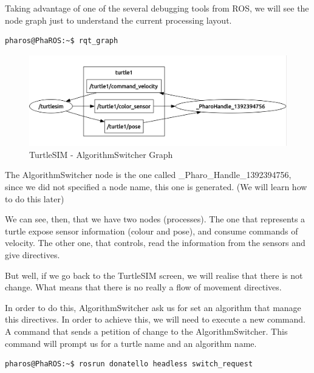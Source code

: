 \documentclass[a4paper,10pt,twoside]{book}
\begin{document}
		
		
			
			Taking advantage of one of the several debugging tools from ROS, we will see the node graph just to understand the current processing layout.
			
			
			\begin{lstlisting}[language=bash,title={Analysing graph topology}]
				pharos@PhaROS:~$ rqt_graph
			\end{lstlisting}
			
			\begin{figure}[!htbp]
  				\centering
    				\includegraphics[width=1\textwidth]{TurtleSIMGraph1.png}
				\centering
				
				\caption{TurtleSIM - AlgorithmSwitcher Graph \label{img:TurtleSIMGraph1} }
			\end{figure}


			The AlgorithmSwitcher node is the one called \_Pharo\_Handle\_1392394756, since we did not specified a node name, this one is generated. (We will learn how to do this later)
			
			
			We can see, then, that we have two nodes (processes). The one that represents a turtle expose sensor information (colour and pose), and consume commands of velocity. The other one, that controls, read the information from the sensors and give directives.
			
			
			But well, if we go back to the TurtleSIM screen, we will realise that there is not change. What means that there is no really a flow of movement directives. 
			
			In order to do this, AlgorithmSwitcher ask us for set an algorithm that manage this directives. In order to achieve this, we will need to execute a new command. A command that sends a petition of change to the AlgorithmSwitcher.
			This command will prompt us for a turtle name and an algorithm name.
			
			
			
			\begin{lstlisting}[language=bash,title={Starting up Donatello/SwitchRequest}]
				pharos@PhaROS:~$ rosrun donatello headless switch_request
			\end{lstlisting}
			
\end{document}
